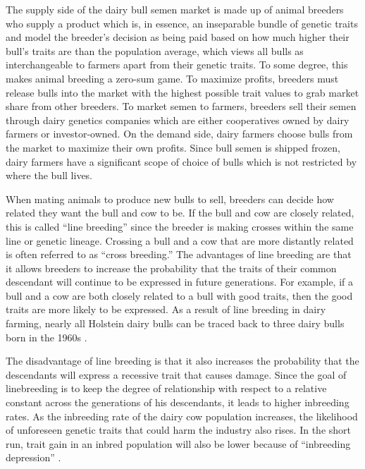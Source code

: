 \documentclass[12pt,letterpaper]{article}
\begin{document}
The supply side of the dairy bull semen market is made up of animal breeders who supply a product which is, in essence, an inseparable bundle of genetic traits 
\citet{Melton_Heady_Willham1979} and \citet{Melton1994} model the breeder's decision as being paid based on how much higher their bull's traits are than the population average, which views all bulls as interchangeable to farmers apart from their genetic traits. 
To some degree, this makes animal breeding a zero-sum game. 
To maximize profits, breeders must release bulls into the market with the highest possible trait values to grab market share from other breeders.
To market semen to farmers, breeders sell their semen through dairy genetics companies which are either cooperatives owned by dairy farmers or investor-owned.
On the demand side, dairy farmers choose bulls from the market to maximize their own profits.
Since bull semen is shipped frozen, dairy farmers have a significant scope of choice of bulls which is not restricted by where the bull lives.

When mating animals to produce new bulls to sell, breeders can decide how related they want the bull and cow to be.
If the bull and cow are closely related, this is called ``line breeding'' since the breeder is making crosses within the same line or genetic lineage. 
Crossing a bull and a cow that are more distantly related is often referred to as ``cross breeding.''
The advantages of line breeding are that it allows breeders to increase the probability that the traits of their common descendant will continue to be expressed in future generations.
For example, if a bull and a cow are both closely related to a bull with good traits, then the good traits are more likely to be expressed.
As a result of line breeding in dairy farming, nearly all Holstein dairy bulls can be traced back to three dairy bulls born in the 1960s \citep{Yue2015}.

The disadvantage of line breeding is that it also increases the probability that the descendants will express a recessive trait that causes damage.
Since the goal of linebreeding is to keep the degree of relationship with respect to a relative constant across the generations of his descendants, it leads to higher inbreeding rates.
As the inbreeding rate of the dairy cow population increases, the likelihood of unforeseen genetic traits that could harm the industry also rises.
In the short run, trait gain in an inbred population will also be lower because of ``inbreeding depression'' \citep{gutierrez2022review,Smith1998}.
\end{document}
